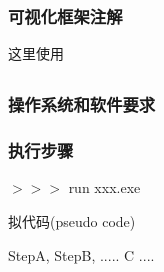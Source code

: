 \subsubsection{可视化框架注解}

这里使用

\subsection{}


\subsubsection{操作系统和软件要求}


\subsubsection{执行步骤}


$>>>$ run xxx.exe

拟代码(pseudo code)


StepA,  StepB,      .....   C ....

{}